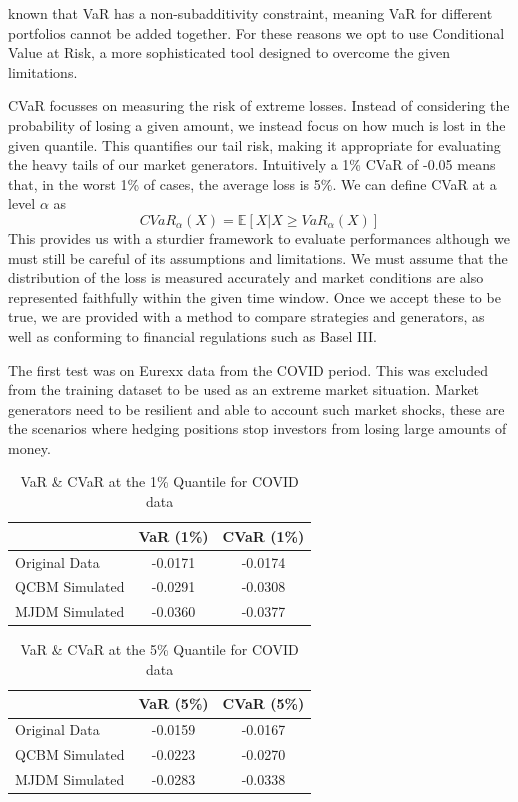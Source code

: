 \documentclass[12pt]{article}
\newcommand{\newp}
    {
    \vskip 0.5cm 
  }
\numberwithin{equation}{section}
\begin{document}
known that VaR has a non-subadditivity constraint, meaning VaR for different portfolios 
cannot be added together. For these reasons we opt to use Conditional Value at 
Risk, a more sophisticated tool designed to overcome the given limitations. 
\newp 
CVaR focusses on measuring the risk of extreme losses. Instead of 
considering the probability of losing a given amount, we instead focus on how 
much is lost in the given quantile. This quantifies our tail risk, making it 
appropriate for evaluating the heavy tails of our market generators. Intuitively 
a 1\% CVaR of -0.05 means that, in the worst 1\% of cases, the average loss is 5\%. 
We can define CVaR at a level $\alpha$ as 
\begin{equation}
  CVaR_{\alpha}(X) = \mathbb{E}[X | X \geq VaR_{\alpha}(X)]
\end{equation}
This provides us with a sturdier framework to evaluate performances although we 
must still be careful of its assumptions and limitations. We must assume that the 
distribution of the loss is measured accurately and market conditions are also 
represented faithfully within the given time window. Once we accept these to be 
true, we are provided with a method to compare strategies and generators, as well 
as conforming to financial regulations such as Basel III.
\newp 
The first test was on Eurexx data from the COVID period. This was excluded from the training 
dataset to be used as an extreme market situation. Market generators need to be 
resilient and able to account such market shocks, these are the scenarios where 
hedging positions stop investors from losing large amounts of money.
\begin{table}[h!]
\centering
\begin{tabular}{lcc}
\hline
\textbf{} & \textbf{VaR (1\%)} & \textbf{CVaR (1\%)} \\
\hline
Original Data     & -0.0171 & -0.0174 \\
QCBM Simulated    & -0.0291 & -0.0308 \\
MJDM Simulated    & -0.0360 & -0.0377 \\
\hline
\end{tabular}
\caption{VaR \& CVaR at the 1\% Quantile for COVID data}
\label{tab:cvar_1}
\end{table}
\begin{table}[h!]
\centering
\begin{tabular}{lcc}
\hline
\textbf{} & \textbf{VaR (5\%)} & \textbf{CVaR (5\%)} \\
\hline
Original Data     & -0.0159 & -0.0167 \\
QCBM Simulated    & -0.0223 & -0.0270 \\
MJDM Simulated    & -0.0283 & -0.0338 \\
\hline
\end{tabular}
\caption{VaR \& CVaR at the 5\% Quantile for COVID data}
\label{tab:cvar_5}
\end{table}
\end{document}
